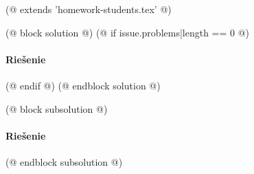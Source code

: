 (@ extends 'homework-students.tex' @)

(@ block solution @)
    (@ if issue.problems|length == 0 @)
        \paragraph{Riešenie}
    (@ endif @)
(@ endblock solution @)

(@ block subsolution @)
    \paragraph{Riešenie}
(@ endblock subsolution @)
